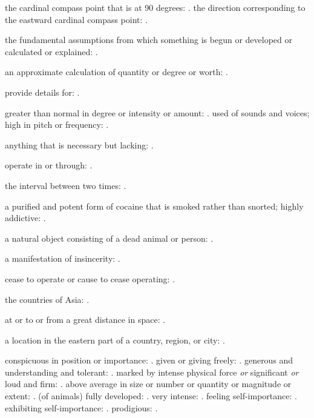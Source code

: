   the cardinal compass point that is at 90 degrees:   . the direction corresponding to the eastward cardinal compass point: .

  the fundamental assumptions from which something is begun or developed or calculated or explained:   .

  an approximate calculation of quantity or degree or worth:   .

  provide details for: .

  greater than normal in degree or intensity or amount: . used of sounds and voices; high in pitch or frequency:   .

  anything that is necessary but lacking:   .

  operate in or through: .

  the interval between two times:   .

  a purified and potent form of cocaine that is smoked rather than snorted; highly addictive:   .

  a natural object consisting of a dead animal or person:   .

  a manifestation of insincerity: .

  cease to operate or cause to cease operating:   .

  the countries of Asia:   .

  at or to or from a great distance in space: .

  a location in the eastern part of a country, region, or city: .

  conspicuous in position or importance:   . given or giving freely:   . generous and understanding and tolerant:   . marked by intense physical force \textit{or} significant \textit{or} loud and firm: . above average in size or number or quantity or magnitude or extent:   . (of animals) fully developed:   . very intense:   . feeling self-importance:   . exhibiting self-importance:   . prodigious:   .


